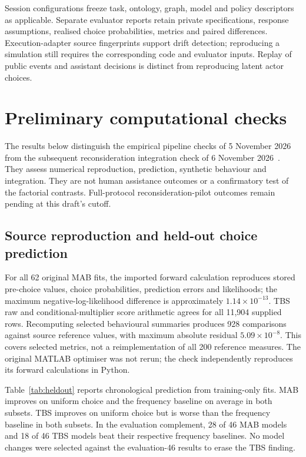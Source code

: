 \documentclass[11pt,a4paper]{article}
\begin{document}
Session configurations freeze task, ontology, graph, model and policy descriptors as applicable. Separate evaluator reports retain private specifications, response assumptions, realised choice probabilities, metrics and paired differences. Execution-adapter source fingerprints support drift detection; reproducing a simulation still requires the corresponding code and evaluator inputs. Replay of public events and assistant decisions is distinct from reproducing latent actor choices.

\section{Preliminary computational checks}
\label{sec:computational-checks}
The results below distinguish the empirical pipeline checks of 5 November 2026~\cite{pipeline} from the subsequent reconsideration integration check of 6 November 2026~\cite{reconsiderationpilot}. They assess numerical reproduction, prediction, synthetic behaviour and integration. They are not human assistance outcomes or a confirmatory test of the factorial contrasts. Full-protocol reconsideration-pilot outcomes remain pending at this draft's cutoff.

\subsection{Source reproduction and held-out choice prediction}
For all 62 original MAB fits, the imported forward calculation reproduces stored pre-choice values, choice probabilities, prediction errors and likelihoods; the maximum negative-log-likelihood difference is approximately $1.14\times10^{-13}$. TBS raw and conditional-multiplier score arithmetic agrees for all 11,904 supplied rows. Recomputing selected behavioural summaries produces 928 comparisons against source reference values, with maximum absolute residual $5.09\times10^{-8}$. This covers selected metrics, not a reimplementation of all 200 reference measures. The original MATLAB optimiser was not rerun; the check independently reproduces its forward calculations in Python.

Table~\ref{tab:heldout} reports chronological prediction from training-only fits. MAB improves on uniform choice and the frequency baseline on average in both subsets. TBS improves on uniform choice but is worse than the frequency baseline in both subsets. In the evaluation complement, 28 of 46 MAB models and 18 of 46 TBS models beat their respective frequency baselines. No model changes were selected against the evaluation-46 results to erase the TBS finding.
\end{document}
